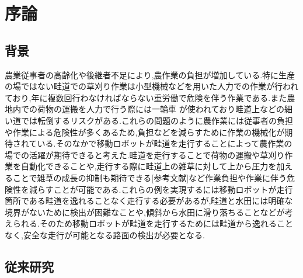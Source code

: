 \chapter{序論}
\section{背景}
農業従事者の高齢化や後継者不足により,農作業の負担が増加している.特に生産の場ではない畦道での草刈り作業は小型機械などを用いた人力での作業が行われており,年に複数回行わなければならない重労働で危険を伴う作業である.また農地内での荷物の運搬を人力で行う際には一輪車%
が使われており畦道上などの細い道では転倒するリスクがある.これらの問題のように農作業には従事者の負担や作業による危険性が多くあるため,負担などを減らすために作業の機械化が期待されている.そのなかで移動ロボットが畦道を走行することによって農作業の場での活躍が期待できると考えた.畦道を走行することで荷物の運搬や草刈り作業を自動化できることや,走行する際に畦道上の雑草に対して上から圧力を加えることで雑草の成長の抑制も期待できる[参考文献]など作業負担や作業に伴う危険性を減らすことが可能である.これらの例を実現するには移動ロボットが走行箇所である畦道を逸れることなく走行する必要があるが,畦道と水田には明確な境界がないために検出が困難なことや,傾斜から水田に滑り落ちることなどが考えられる.そのため移動ロボットが畦道を走行するためには畦道から逸れることなく,安全な走行が可能となる路面の検出が必要となる.
\section{従来研究}


%
